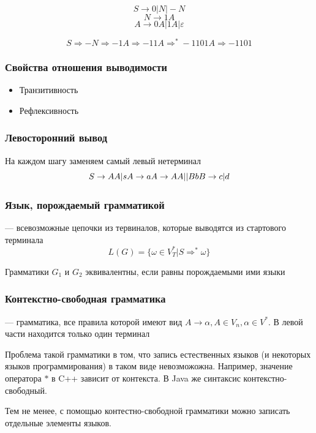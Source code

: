 \documentclass[a4paper, 14pt]{extarticle}
\begin{document}
\[ S \rightarrow 0 | N | -N \]
\[ N \rightarrow 1A \]
\[ A \rightarrow 0A | 1A | \varepsilon \]

\[ S \Rightarrow -N \Rightarrow -1A \Rightarrow -11A \Rightarrow^* -1101A \Rightarrow -1101 \]

\subsubsection*{Свойства отношения выводимости}
\begin{itemize}
    \item Транзитивность %
    \item Рефлексивность
\end{itemize}

\subsubsection*{Левосторонний вывод}
На каждом шагу заменяем самый левый нетерминал
\begin{equation} %
    S \rightarrow AA | s\\
    A \rightarrow a\\
    A \rightarrow AA || Bb\\
    B \rightarrow c | d
\end{equation}

\subsubsection*{Язык, порождаемый грамматикой} --- всевозможные цепочки из тервиналов, которые выводятся из стартового терминала
\[ L(G) = \{ \omega \in V_T^* | S \Rightarrow^* \omega \} \]

Грамматики $G_1$ и $G_2$ эквивалентны, если равны порождаемыми ими языки

\subsubsection*{Контекстно-свободная грамматика} --- грамматика, все правила которой имеют вид $A \rightarrow \alpha, A \in V_n, \alpha \in V^*$. В левой части находится только один терминал

Проблема такой грамматики в том, что запись естественных языков (и некоторых языков программирования) в таком виде невозможожна. Например, значение оператора $*$ в C++ зависит от контекста. В Java же синтаксис контекстно-свободный.

Тем не менее, с помощью контестно-свободной грамматики можно записать отдельные элементы языков. 
\end{document}
